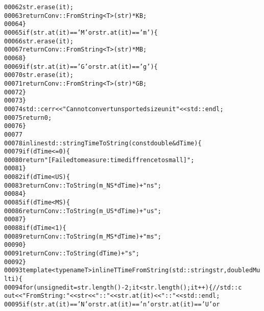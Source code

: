 \begin{footnotesize}
\begin{alltt}
00062                     str.erase(it);
00063                     \textcolor{keywordflow}{return} Conv::FromString<T>(str) * KB;
00064                 \}
00065                 \textcolor{keywordflow}{if}(str.at(it) == \textcolor{charliteral}{'M'} or str.at(it) == \textcolor{charliteral}{'m'})\{
00066                     str.erase(it);
00067                     \textcolor{keywordflow}{return} Conv::FromString<T>(str) * MB;
00068                 \}
00069                 \textcolor{keywordflow}{if}(str.at(it) == \textcolor{charliteral}{'G'} or str.at(it) == \textcolor{charliteral}{'g'})\{
00070                     str.erase(it);
00071                     \textcolor{keywordflow}{return} Conv::FromString<T>(str) * GB;
00072                 \}
00073             \}
00074             std::cerr<<\textcolor{stringliteral}{"Cannot convert unsported size unit"}<<std::endl;
00075             \textcolor{keywordflow}{return} 0;
00076         \}
00077 
00078         \textcolor{keyword}{inline} std::string TimeToString(\textcolor{keyword}{const} \textcolor{keywordtype}{double} &dTime)\{
00079             \textcolor{keywordflow}{if} ( dTime <= 0)\{
00080                 \textcolor{keywordflow}{return} \textcolor{stringliteral}{"[Failed to measure: time diffrence to small]"};
00081             \}
00082             \textcolor{keywordflow}{if} (dTime < US)\{
00083                 \textcolor{keywordflow}{return} Conv::ToString(m\_NS * dTime)+\textcolor{stringliteral}{"ns"};
00084             \}
00085             \textcolor{keywordflow}{if}(dTime < MS)\{
00086                 \textcolor{keywordflow}{return} Conv::ToString(m\_US * dTime)+\textcolor{stringliteral}{"us"};
00087             \}
00088             \textcolor{keywordflow}{if}(dTime < 1)\{
00089                 \textcolor{keywordflow}{return} Conv::ToString(m\_MS * dTime)+\textcolor{stringliteral}{"ms"};
00090             \}
00091             \textcolor{keywordflow}{return} Conv::ToString(dTime)+\textcolor{stringliteral}{"s"};
00092         \}
00093         \textcolor{keyword}{template} <\textcolor{keyword}{typename} T> \textcolor{keyword}{inline} T TimeFromString(std::string str, \textcolor{keywordtype}{double} dMu
      lti)\{
00094             \textcolor{keywordflow}{for} (\textcolor{keywordtype}{unsigned} it = str.length()-2; it < str.length(); it++)\{ \textcolor{comment}{//std::c
      out<<"FromString: "<<str<<"::"<<str.at(it)<<"::"<<std::endl;}
00095                 \textcolor{keywordflow}{if}(str.at(it) == \textcolor{charliteral}{'N'} or str.at(it) == \textcolor{charliteral}{'n'} or str.at(it) == \textcolor{charliteral}{'U'} or

\end{alltt}
\end{footnotesize}
